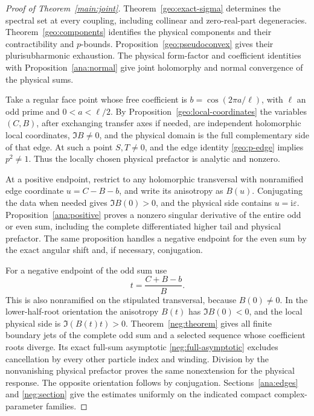 \documentclass[11pt]{article}
\numberwithin{equation}{section}
\theoremstyle{definition}
\newcommand{\ii}{\mathrm i}
\newcommand{\eps}{\varepsilon}
\begin{document}
\begin{proof}[Proof of Theorem~\ref{main:joint}]
Theorem~\ref{geo:exact-sigma} determines the spectral set at every
coupling, including collinear and zero-real-part degeneracies.
Theorem~\ref{geo:components} identifies the physical components
and their contractibility and \(p\)-bounds.
Proposition~\ref{geo:pseudoconvex} gives their plurisubharmonic
exhaustion. The physical form-factor and coefficient identities with
Proposition~\ref{ana:normal} give joint holomorphy and normal
convergence of the physical sums.

Take a regular face point whose free coefficient is
\(b=\cos(2\pi a/\ell)\), with \(\ell\) an odd prime and
\(0<a<\ell/2\). By Proposition~\ref{geo:local-coordinates} the
variables \((C,B)\), after exchanging transfer axes if needed,
are independent holomorphic local coordinates, \(\Im B\ne0\),
and the physical domain is the full complementary side of that edge.
At such a point \(S,T\ne0\), and the edge identity
\eqref{geo:p-edge} implies \(p^2\ne1\). Thus the locally chosen
physical prefactor is analytic and nonzero.

At a positive endpoint, restrict to any holomorphic transversal with
nonramified edge coordinate \(u=C-B-b\), and write its anisotropy
as \(B(u)\). Conjugating the data when
needed gives \(\Im B(0)>0\), and the physical side contains
\(u=\ii\eps\). Proposition~\ref{ana:positive} proves a nonzero
singular derivative of the entire odd or even sum, including the
complete differentiated higher tail and physical prefactor. The
same proposition handles a negative endpoint for the even sum by
the exact angular shift and, if necessary, conjugation.

For a negative endpoint of the odd sum use
\[
             t=\frac{C+B-b}{B}.
\]
This is also nonramified on the stipulated transversal, because
\(B(0)\ne0\). In the lower-half-root orientation the anisotropy
\(B(t)\) has \(\Im B(0)<0\), and the local physical side is
\(\Im(B(t)t)>0\). Theorem~\ref{neg:theorem} gives all finite
boundary jets of the complete odd sum and a selected sequence
whose coefficient roots diverge. Its exact full-sum asymptotic
\eqref{neg:full-asymptotic} excludes cancellation by every other
particle index and winding. Division by the nonvanishing physical
prefactor proves the same nonextension for the physical response.
The opposite orientation follows by conjugation.
Sections~\ref{ana:edges} and \ref{neg:section} give the estimates
uniformly on the indicated compact complex-parameter families.


\end{proof}
\end{document}
